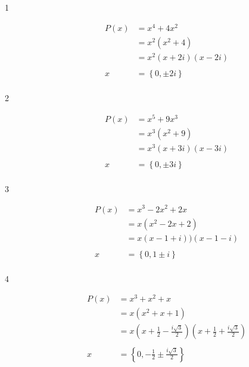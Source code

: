 \documentclass{exam}
\begin{document}
    \begin{description}

      \item[1] 
        \begin{align*}
          P(x) &= x^4 + 4x^2 \\
               &= x^2(x^2 + 4) \\
               &= x^2(x + 2i)(x - 2i) \\
               \\
          x    &= \boxed{\left\{ 0, \pm 2i \right\}} \\
        \end{align*}

      \item[2] 
        \begin{align*}
          P(x) &= x^5 + 9x^3 \\
               &= x^3(x^2 + 9) \\
               &= x^3(x + 3i)(x - 3i) \\
               \\
          x    &= \boxed{\left\{ 0, \pm 3i \right\}} \\
        \end{align*}

      \item[3] 
        \begin{align*}
          P(x) &= x^3 - 2x^2 + 2x \\
               &= x(x^2 - 2x + 2) \\
               &= x(x - 1 + i))(x - 1 - i) \\
               \\
          x    &= \boxed{\left\{ 0, 1 \pm i \right\}} \\
        \end{align*}

      \item[4] 
        \begin{align*}
          P(x) &= x^3 + x^2 + x \\
               &= x(x^2 + x + 1) \\
               &= x \left(x + \frac{1}{2} - \frac{i \sqrt{3}}{2} \right) 
                  \left(x + \frac{1}{2} + \frac{i \sqrt{3}}{2} \right) \\
               \\
          x    &= \boxed{\left\{ 0, -\frac{1}{2} \pm \frac{i \sqrt{3}}{2} \right\}} \\
        \end{align*}


\end{description}
\end{document}
